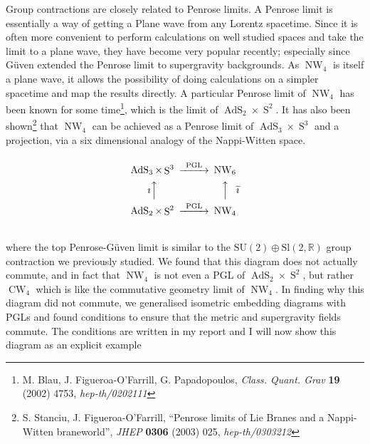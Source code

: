 \documentclass[14pt, a4paper, titlepage]{slides}
\DeclareMathOperator{\AdS}{AdS}
\DeclareMathOperator{\Sphere}{S}
\DeclareMathOperator{\NW}{NW}
\DeclareMathOperator{\CW}{CW}
\let\S\Sphere
\begin{document}
Group contractions are closely related to Penrose limits. A Penrose limit is
essentially a way of getting a Plane wave from any Lorentz spacetime. Since it
is often more convenient to perform calculations on well studied spaces and take
the limit to a plane wave, they have become very popular recently; especially
since G\"{u}ven extended the Penrose limit to supergravity backgrounds. As
$\NW_4$ is itself a plane wave, it allows the possibility of doing calculations
on a simpler spacetime and map the results directly. A particular Penrose limit
of $\NW_4$ has been known for some time\footnote{M. Blau, J. Figueroa-O'Farrill,
  G. Papadopoulos, \textit{Class.  Quant. Grav} \textbf{19} (2002) 4753,
  \textit{hep-th/0202111}}, which is the limit of $\AdS_2\times\S^2$. It has
also been shown\footnote{S. Stanciu, J. Figueroa-O'Farrill, ``Penrose limits of Lie
  Branes and a Nappi-Witten braneworld'', \textit{JHEP} \textbf{0306} (2003)
  025, \textit{hep-th/0303212}} that $\NW_4$ can be achieved as a Penrose limit
of $\AdS_3\times\S^3$ and a projection, via a six dimensional analogy of the
Nappi-Witten space.
\begin{equation*}
  \begin{CD}
    @.\\
    \AdS_3 \times \S^3             @>\text{PGL}>> \NW_6\\
    \text{$\imath$}@AAA @AAA\text{$\widetilde{\imath}$}\\
    \AdS_2 \times \S^2             @>\text{PGL}>> \NW_4\\
    @.
  \end{CD}
\end{equation*}
where the top Penrose-G\"{u}ven limit is similar to the $\mathrm{SU}(2)\oplus
\mathrm{Sl}(2,\mathbb{R})$ group contraction we previously studied. We found
that this diagram does not actually commute, and in fact that $\NW_4$ is not
even a PGL of $\AdS_2\times\S^2$, but rather $\CW_4$ which is like the
commutative geometry limit of $\NW_4$. In finding why this diagram did not
commute, we generalised isometric embedding diagrams with PGLs and found
conditions to ensure that the metric and supergravity fields commute. The
conditions are written in my report and I will now show this diagram as an
explicit example
\end{document}
